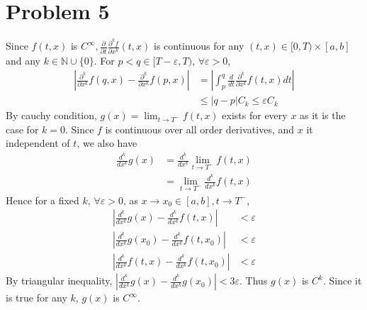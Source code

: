 \documentclass{report}
\def\ve{\varepsilon}
\def\abs#1{\left| #1 \right|}
\def\p{\partial}
\begin{document}
    \section*{Problem 5}
    Since $f(t, x)$ is $C^\infty, \frac{\p}{\p t} \frac{\p^k f}{\p x^k} (t, x)$ is 
    continuous for any $(t, x) \in [0, T) \times [a,b]$ and any $k \in \mathbb{N} \cup \{0\}$.
    For $p< q \in [T - \ve, T)$, $\forall \ve > 0$,
    \begin{align*}
        \abs{\frac{\p^k}{\p x^k}f(q, x) - \frac{\p^k}{\p x^k}f(p, x)} &= 
            \abs{\int_p^q \frac{d}{dt} \frac{\p^k}{\p x^k}f(t, x) dt}\\
            &\le \abs{q-p} C_k \le \ve C_k
    \end{align*} 
    By cauchy condition,
    $g(x) = \lim_{t \to T^{-}} f(t,x)$ exists for every $x$ as it is the case for $k = 0$.
    Since $f$ is continuous over all order derivatives, and $x$ it independent of $t$, we also have
    \begin{align*}
        \frac{d^k}{dx^k}g(x) &= \frac{d^k}{dx^k} \lim_{t \to T^-} f(t, x) \\
            &= \lim_{t \to T^-} \frac{d^k}{dx^k} f(t, x)
    \end{align*}
    Hence for a fixed $k$, $\forall \ve > 0$, as $x \to x_0 \in [a, b], t \to T^-$,
    \begin{align*}
        \abs{\frac{d^k}{dx^k}g(x) - \frac{d^k}{dx^k} f(t, x)} &< \ve \\
        \abs{\frac{d^k}{dx^k}g(x_0) - \frac{d^k}{dx^k} f(t, x_0)} &< \ve \\
        \abs{\frac{d^k}{dx^k} f(t, x) - \frac{d^k}{dx^k} f(t, x_0)} &< \ve
    \end{align*}
    By triangular inequality, $\abs{\frac{d^k}{dx^k}g(x) - \frac{d^k}{dx^k}g(x_0)} < 3\ve$.
    Thus $g(x)$ is $C^k$. Since it is true for any $k$, $g(x)$ is $C^\infty$.
\end{document}
